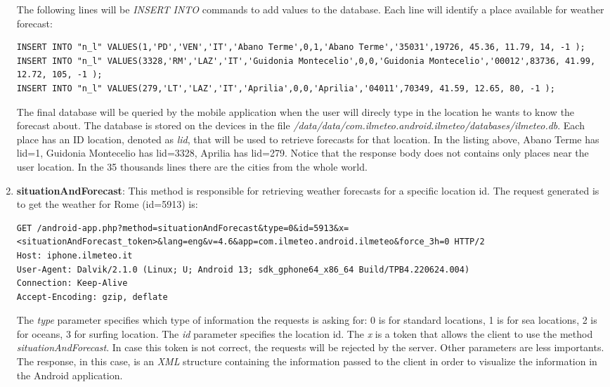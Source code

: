 \begin{enumerate}
\begin{lstlisting}
\end{lstlisting}	
						The following lines will be \textit{INSERT INTO} commands to add values to the database. Each line will identify a place available for weather forecast:
\begin{lstlisting}
INSERT INTO "n_l" VALUES(1,'PD','VEN','IT','Abano Terme',0,1,'Abano Terme','35031',19726, 45.36, 11.79, 14, -1 );
INSERT INTO "n_l" VALUES(3328,'RM','LAZ','IT','Guidonia Montecelio',0,0,'Guidonia Montecelio','00012',83736, 41.99, 12.72, 105, -1 );
INSERT INTO "n_l" VALUES(279,'LT','LAZ','IT','Aprilia',0,0,'Aprilia','04011',70349, 41.59, 12.65, 80, -1 );
\end{lstlisting}
						The final database will be queried by the mobile application when the user will direcly type in the location he wants to know the forecast about. The database is stored on the devices in the file \textit{/data/data/com.ilmeteo.android.ilmeteo/databases/ilmeteo.db}. Each place has an ID location, denoted as \textit{lid}, that will be used to retrieve forecasts for that location. In the listing above, Abano Terme has lid=1, Guidonia Montecelio has lid=3328, Aprilia has lid=279. Notice that the response body does not contains only places near the user location. In the 35 thousands lines there are the cities from the whole world.
					\item \textbf{situationAndForecast}: This method is responsible for retrieving weather forecasts for a specific location id. The request generated is to get the weather for Rome (id=5913) is:
\begin{lstlisting}
GET /android-app.php?method=situationAndForecast&type=0&id=5913&x=<situationAndForecast_token>&lang=eng&v=4.6&app=com.ilmeteo.android.ilmeteo&force_3h=0 HTTP/2
Host: iphone.ilmeteo.it
User-Agent: Dalvik/2.1.0 (Linux; U; Android 13; sdk_gphone64_x86_64 Build/TPB4.220624.004)
Connection: Keep-Alive
Accept-Encoding: gzip, deflate
\end{lstlisting}	
					The \textit{type} parameter specifies which type of information the requests is asking for: 0 is for standard locations, 1 is for sea locations, 2 is for oceans, 3 for surfing location. \newline
					The \textit{id} parameter specifies the location id.\newline
					The \textit{x} is a token that allows the client to use the method \textit{situationAndForecast}. In case this token is not correct, the requests will be rejected by the server.\newline
					Other parameters are less importants. 
					The response, in this case, is an \textit{XML} structure containing the information passed to the client in order to visualize the information in the Android application.
				\end{enumerate}
				
